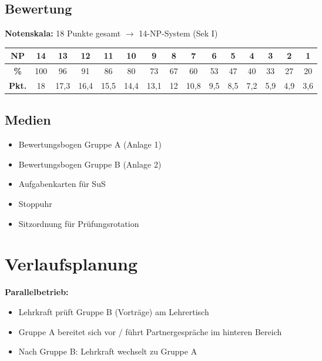 \documentclass[11pt,a4paper]{article}
\begin{document}
\subsection{Bewertung}

\textbf{Notenskala:} 18 Punkte gesamt $\rightarrow$ 14-NP-System (Sek I)

\begin{tabular}{|c|c|c|c|c|c|c|c|c|c|c|c|c|c|c|}
\hline
\textbf{NP} & 14 & 13 & 12 & 11 & 10 & 9 & 8 & 7 & 6 & 5 & 4 & 3 & 2 & 1 \\
\hline
\textbf{\%} & 100 & 96 & 91 & 86 & 80 & 73 & 67 & 60 & 53 & 47 & 40 & 33 & 27 & 20 \\
\hline
\textbf{Pkt.} & 18 & 17,3 & 16,4 & 15,5 & 14,4 & 13,1 & 12 & 10,8 & 9,5 & 8,5 & 7,2 & 5,9 & 4,9 & 3,6 \\
\hline
\end{tabular}

\subsection{Medien}
\begin{itemize}
    \item Bewertungsbogen Gruppe A (Anlage 1)
    \item Bewertungsbogen Gruppe B (Anlage 2)
    \item Aufgabenkarten für SuS
    \item Stoppuhr
    \item Sitzordnung für Prüfungsrotation
\end{itemize}

\section{Verlaufsplanung}

\begin{warnbox}
\textbf{Parallelbetrieb:}
\begin{itemize}
    \item Lehrkraft prüft Gruppe B (Vorträge) am Lehrertisch
    \item Gruppe A bereitet sich vor / führt Partnergespräche im hinteren Bereich
    \item Nach Gruppe B: Lehrkraft wechselt zu Gruppe A
\end{itemize}
\end{warnbox}
\end{document}
